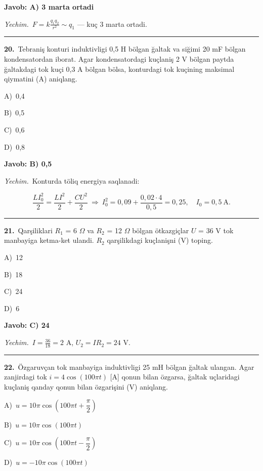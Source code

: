 \documentclass[11pt,a4paper]{article}
\newcommand{\opt}[2]{\hspace*{4mm}#1)\ #2\par}
\begin{document}
\noindent\colorbox{gray!12}{\parbox{\dimexpr\linewidth-2\fboxsep}{\textbf{Javob: A) 3 marta ortadi}}}\par\smallskip
\noindent\textit{Yechim.}\ $F=k\frac{q_1q_2}{r^2}\sim q_1$ — kuç 3 marta ortadi.\par\par\medskip\hrule\medskip
{}\noindent\begin{minipage}{\linewidth}
\textbf{20.}\ Tebraniş konturi induktivligi 0,5 H bölgan ğaltak va siğimi 20 mF bölgan kondensatordan iborat. Agar kondensatordagi kuçlaniş 2 V bölgan paytda ğaltakdagi tok kuçi 0,3 A bölgan bölsa, konturdagi tok kuçining maksimal qiymatini (A) aniqlang.\par\smallskip
\opt{A}{0,4}
\opt{B}{0,5}
\opt{C}{0,6}
\opt{D}{0,8}
\end{minipage}\vspace{2pt}\par
\noindent\colorbox{gray!12}{\parbox{\dimexpr\linewidth-2\fboxsep}{\textbf{Javob: B) 0,5}}}\par\smallskip
\noindent\textit{Yechim.}\ Konturda töliq energiya saqlanadi:\par
\[\frac{LI_0^2}{2}=\frac{LI^2}{2}+\frac{CU^2}{2}\ \Rightarrow\ I_0^2=0{,}09+\frac{0{,}02\cdot4}{0{,}5}=0{,}25,\quad I_0=0{,}5\ \text{A}.\]\par\medskip\hrule\medskip
{}\noindent\begin{minipage}{\linewidth}
\textbf{21.}\ Qarşiliklari $R_1$ = 6 $\Omega$ va $R_2$ = 12 $\Omega$ bölgan ötkazgiçlar $U$ = 36 V tok manbayiga ketma-ket ulandi. $R_2$ qarşilikdagi kuçlanişni (V) toping.\par\smallskip
\opt{A}{12}
\opt{B}{18}
\opt{C}{24}
\opt{D}{6}
\end{minipage}\vspace{2pt}\par
\noindent\colorbox{gray!12}{\parbox{\dimexpr\linewidth-2\fboxsep}{\textbf{Javob: C) 24}}}\par\smallskip
\noindent\textit{Yechim.}\ $I=\frac{36}{18}=2$ A, $U_2=IR_2=24$ V.\par\par\medskip\hrule\medskip
{}\noindent\begin{minipage}{\linewidth}
\textbf{22.}\ Özgaruvçan tok manbayiga induktivligi 25 mH bölgan ğaltak ulangan. Agar zanjirdagi tok $i = 4\cos(100\pi t)$ [A] qonun bilan özgarsa, ğaltak uçlaridagi kuçlaniş qanday qonun bilan özgarişini (V) aniqlang.\par\smallskip
\opt{A}{$u = 10\pi\cos(100\pi t + \dfrac{\pi}{2})$}
\opt{B}{$u = 10\pi\cos(100\pi t)$}
\opt{C}{$u = 10\pi\cos(100\pi t - \dfrac{\pi}{2})$}
\opt{D}{$u = -10\pi\cos(100\pi t)$}
\end{minipage}\vspace{2pt}\par
\end{document}
